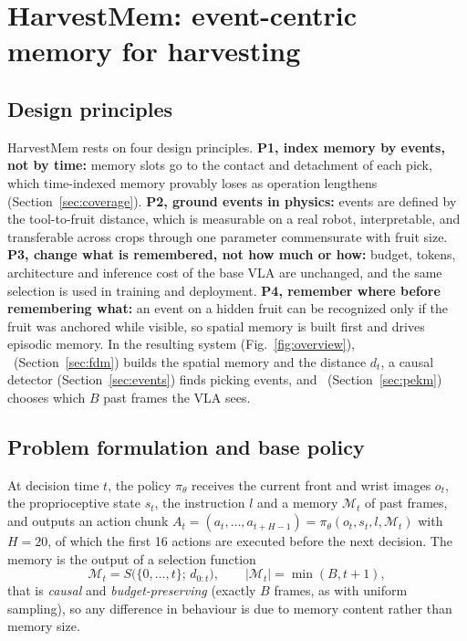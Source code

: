 \section{HarvestMem: event-centric memory for harvesting}
\label{sec:method}

\subsection{Design principles}
\label{sec:principles}
HarvestMem rests on four design principles.
\textbf{P1, index memory by events, not by time:} memory slots go to the contact and detachment of each pick, which time-indexed memory provably loses as operation lengthens (Section~\ref{sec:coverage}).
\textbf{P2, ground events in physics:} events are defined by the tool-to-fruit distance, which is measurable on a real robot, interpretable, and transferable across crops through one parameter commensurate with fruit size.
\textbf{P3, change what is remembered, not how much or how:} budget, tokens, architecture and inference cost of the base VLA are unchanged, and the same selection is used in training and deployment.
\textbf{P4, remember where before remembering what:} an event on a hidden fruit can be recognized only if the fruit was anchored while visible, so spatial memory is built first and drives episodic memory.
In the resulting system (Fig.~\ref{fig:overview}), \fdm\ (Section~\ref{sec:fdm}) builds the spatial memory and the distance $d_t$, a causal detector (Section~\ref{sec:events}) finds picking events, and \pekm\ (Section~\ref{sec:pekm}) chooses which $B$ past frames the VLA sees.

\subsection{Problem formulation and base policy}
\label{sec:formulation}
At decision time $t$, the policy $\pi_\theta$ receives the current front and wrist images $o_t$, the proprioceptive state $s_t$, the instruction $l$ and a memory $\mathcal{M}_t$ of past frames, and outputs an action chunk $A_t = (a_t,\dots,a_{t+H-1}) = \pi_\theta(o_t, s_t, l, \mathcal{M}_t)$ with $H=20$, of which the first 16 actions are executed before the next decision. The memory is the output of a selection function
\begin{equation}
\mathcal{M}_t = S\big(\{0,\dots,t\};\, d_{0:t}\big),\qquad |\mathcal{M}_t| = \min(B, t+1),
\label{eq:selection}
\end{equation}
that is \emph{causal} and \emph{budget-preserving} (exactly $B$ frames, as with uniform sampling), so any difference in behaviour is due to memory content rather than memory size.

